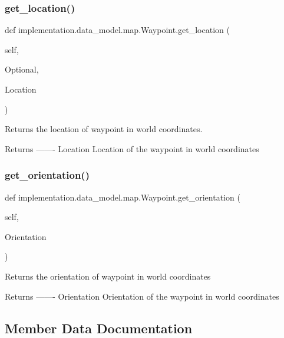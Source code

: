 \subsubsection{\texorpdfstring{get\+\_\+location()}{get\_location()}}
{\footnotesize\ttfamily def implementation.\+data\+\_\+model.\+map.\+Waypoint.\+get\+\_\+location (\begin{DoxyParamCaption}\item[{}]{self,  }\item[{}]{Optional,  }\item[{}]{Location }\end{DoxyParamCaption})}

\begin{DoxyVerb}Returns the location of waypoint in world coordinates.

Returns
-------
Location
    Location of the waypoint in world coordinates
\end{DoxyVerb}
 \mbox{\label{classimplementation_1_1data__model_1_1map_1_1_waypoint_a4bf35400c78d7673b1e10b3039d260e3}} 
\subsubsection{\texorpdfstring{get\+\_\+orientation()}{get\_orientation()}}
{\footnotesize\ttfamily def implementation.\+data\+\_\+model.\+map.\+Waypoint.\+get\+\_\+orientation (\begin{DoxyParamCaption}\item[{}]{self,  }\item[{}]{Orientation }\end{DoxyParamCaption})}

\begin{DoxyVerb}Returns the orientation of waypoint in world coordinates

Returns
-------
Orientation
    Orientation of the waypoint in world coordinates
\end{DoxyVerb}
 

\subsection{Member Data Documentation}
\mbox{\label{classimplementation_1_1data__model_1_1map_1_1_waypoint_aeb94d09fe4b1cd5e76861a543eacfc85}} 
